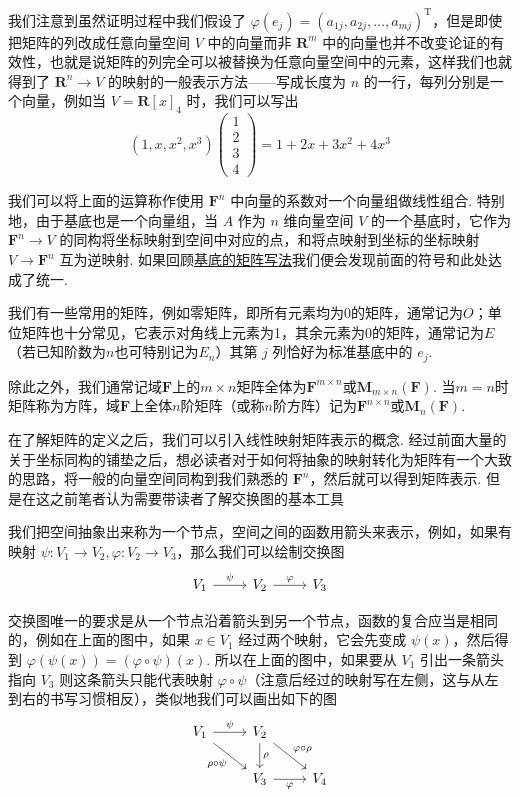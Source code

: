 我们注意到虽然证明过程中我们假设了 $\varphi(e_j) = (a_{1j}, a_{2j}, \ldots, a_{mj})^{\mathrm{T}}$，但是即使把矩阵的列改成任意向量空间 $V$ 中的向量而非 $\mathbf{R}^m$ 中的向量也并不改变论证的有效性，也就是说矩阵的列完全可以被替换为任意向量空间中的元素，这样我们也就得到了 $\mathbf{R}^n \to V$ 的映射的一般表示方法——写成长度为 $n$ 的一行，每列分别是一个向量，例如当 $V = \mathbf{R}[x]_4$ 时，我们可以写出
\[
(1, x, x^2, x^3) \begin{pmatrix}
    1 \\ 2 \\ 3 \\ 4
\end{pmatrix} = 1 + 2x + 3x^2 + 4x^3
\]

我们可以将上面的运算称作使用 $\mathbf{F}^n$ 中向量的系数对一个向量组做线性组合. 特别地，由于基底也是一个向量组，当 $A$ 作为 $n$ 维向量空间 $V$ 的一个基底时，它作为 $\mathbf{F}^n\to V$ 的同构将坐标映射到空间中对应的点，和将点映射到坐标的坐标映射 $V\to\mathbf{F}^n$ 互为逆映射. 如果回顾\hyperlink{基底的矩阵写法}{基底的矩阵写法}我们便会发现前面的符号和此处达成了统一.

我们有一些常用的矩阵，例如零矩阵，即所有元素均为0的矩阵，通常记为$O$；单位矩阵也十分常见，它表示对角线上元素为1，其余元素为0的矩阵，通常记为$E$（若已知阶数为$n$也可特别记为$E_n$）其第 $j$ 列恰好为标准基底中的 $e_j$.

除此之外，我们通常记域$\mathbf{F}$上的$m\times n$矩阵全体为$\mathbf{F}^{m\times n}$或$\mathbf{M}_{m\times n}(\mathbf{F})$. 当$m=n$时矩阵称为方阵，域$\mathbf{F}$上全体$n$阶矩阵（或称$n$阶方阵）记为$\mathbf{F}^{n\times n}$或$\mathbf{M}_n(\mathbf{F})$.

在了解矩阵的定义之后，我们可以引入线性映射矩阵表示的概念. 经过前面大量的关于坐标同构的铺垫之后，想必读者对于如何将抽象的映射转化为矩阵有一个大致的思路，将一般的向量空间同构到我们熟悉的 $\mathbf{F}^n$，然后就可以得到矩阵表示. 但是在这之前笔者认为需要带读者了解交换图的基本工具

我们把空间抽象出来称为一个节点，空间之间的函数用箭头来表示，例如，如果有映射 $\psi\colon V_1 \to V_2, \varphi\colon V_2 \to V_3$，那么我们可以绘制交换图
{
\[
\begin{tikzcd}
V_1 \arrow[r, "\psi"] & V_2 \arrow[r, "\varphi"] & V_3
\end{tikzcd}
\]
}

交换图唯一的要求是从一个节点沿着箭头到另一个节点，函数的复合应当是相同的，例如在上面的图中，如果 $x\in V_1$ 经过两个映射，它会先变成 $\psi(x)$，然后得到 $\varphi(\psi(x)) = (\varphi\circ\psi)(x)$. 所以在上面的图中，如果要从 $V_1$ 引出一条箭头指向 $V_3$ 则这条箭头只能代表映射 $\varphi\circ\psi$（注意后经过的映射写在左侧，这与从左到右的书写习惯相反），类似地我们可以画出如下的图
{
\[
\begin{tikzcd}
V_1 \arrow[r, "\psi"] \ar[rd, "\rho\circ\psi"'] & V_2 \arrow[d, "\rho"] \ar[rd, "\varphi\circ\rho"] \\ & V_3 \ar[r, "\varphi"'] & V_4
\end{tikzcd}
\]
}

